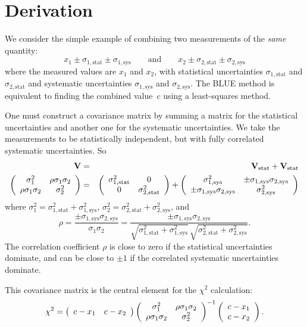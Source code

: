 \documentclass[11pt]{article}
\newcommand{\xa}   {x_1}
\newcommand{\xb}   {x_2}
\newcommand{\uast} {\sigma_{1,\mathrm{stat}}}
\newcommand{\ubst} {\sigma_{2,\mathrm{stat}}}
\newcommand{\uasy} {\sigma_{1,\mathrm{sys}}}
\newcommand{\ubsy} {\sigma_{2,\mathrm{sys}}}
\newcommand{\uastq} {\sigma^2_{1,\mathrm{stat}}}
\newcommand{\ubstq} {\sigma^2_{2,\mathrm{stat}}}
\newcommand{\uasyq} {\sigma^2_{1,\mathrm{sys}}}
\newcommand{\ubsyq} {\sigma^2_{2,\mathrm{sys}}}
\newcommand{\ua} {\sigma_{1}}
\newcommand{\ub} {\sigma_{2}}
\newcommand{\uaq} {\sigma^2_{1}}
\newcommand{\ubq} {\sigma^2_{2}}
\begin{document}
\section{Derivation}
\par
We consider the simple example of combining two measurements of
the {\em same} quantity:
$$
 \xa  \pm \uast \pm \uasy
 \qquad {\mathrm{and}} \qquad
 \xb \pm \ubst \pm \ubsy 
$$
where the measured values are $\xa$ and $\xb$,
with statistical uncertainties $\uast$ and $\ubst$ and
systematic uncertainties $\uasy$ and $\ubsy$.
The BLUE method is equivalent to finding the combined value~$c$
using a least-squares method.
\par
One must construct a covariance matrix by summing a matrix
for the statistical uncertainties and another one for the systematic uncertainties.
We take the measurements to be statistically independent, but
with fully correlated systematic uncertainties.  So
\begin{eqnarray}
 {\mathbf{V}} &=&  {\mathbf{V}}_{\mathrm{stat}} + {\mathbf{V}}_{\mathrm{stat}} \cr
 \left( \begin{array}{cc}
   \uaq & \rho\ua\ub \cr \rho\ua\ub & \ubq \cr
          \end{array} \right) &=&
 \left( \begin{array}{cc}
   \uastq & 0 \cr 0 & \ubstq \cr
          \end{array} \right) +
 \left( \begin{array}{cc}
   \uasyq & \pm\uasy\ubsy \cr \pm\uasy\ubsy & \ubsyq \cr
          \end{array} \right) 
\end{eqnarray}
where $\uaq = \uastq + \uasyq$, $\ubq = \ubstq + \ubsyq$, and
$$
 \rho = \frac{ \pm \uasy \ubsy }{ \ua\ub }
  = \frac{ \pm \uasy \ubsy }
 { \sqrt{ \uastq + \uasyq } \, \sqrt{ \ubstq + \ubsyq } } .
$$
The correlation coefficient $\rho$ is close to zero if the statistical uncertainties
dominate, and can be close to $\pm 1$ if the correlated systematic uncertainties dominate.
\par
This covariance matrix is the central element for the $\chi^2$ calculation:
\begin{equation} \label{eq:chisqdef}
 \chi^2 =
 \left( \begin{array}{cc} c-\xa & c-\xb \cr \end{array} \right)
  \left( \begin{array}{cc}
   \uaq & \rho\ua\ub \cr \rho\ua\ub & \ubq \cr
          \end{array} \right)^{-1}
 \left( \begin{array}{c} c - \xa \cr c - \xb \end{array} \right) .
\end{equation}
\end{document}
